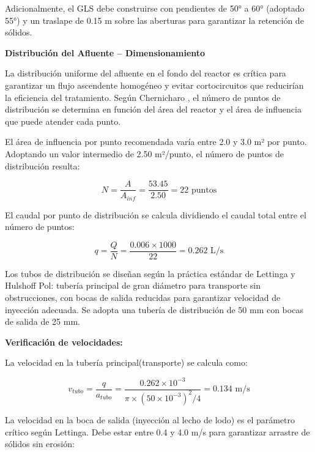 \documentclass[12pt,a4paper]{article}
\begin{document}
Adicionalmente, el GLS debe construirse con pendientes de 50° a 60° (adoptado 55°) y un traslape de 0.15 m sobre las aberturas para garantizar la retención de sólidos.

\textbf{Distribución del Afluente -- Dimensionamiento}

La distribución uniforme del afluente en el fondo del reactor es crítica para garantizar un flujo ascendente homogéneo y evitar cortocircuitos que reducirían la eficiencia del tratamiento. Según Chernicharo \cite{chernicharo2007}, el número de puntos de distribución se determina en función del área del reactor y el área de influencia que puede atender cada punto.

El área de influencia por punto recomendada varía entre 2.0 y 3.0 m² por punto. Adoptando un valor intermedio de 2.50 m²/punto, el número de puntos de distribución resulta:

\begin{equation}
N = \frac{A}{A_{inf}} = \frac{53.45}{2.50} = 22 \text{ puntos}
\end{equation}

El caudal por punto de distribución se calcula dividiendo el caudal total entre el número de puntos:

\begin{equation}
q = \frac{Q}{N} = \frac{0.006 \times 1000}{22} = 0.262 \text{ L/s}
\end{equation}

Los tubos de distribución se diseñan según la práctica estándar de Lettinga y Hulshoff Pol: tubería principal de gran diámetro para transporte sin obstrucciones, con bocas de salida reducidas para garantizar velocidad de inyección adecuada. Se adopta una tubería de distribución de 50 mm con bocas de salida de 25 mm.

\textbf{Verificación de velocidades:}

La velocidad en la tubería principal(transporte) se calcula como:

\begin{equation}
v_{tubo} = \frac{q}{a_{tubo}} = \frac{0.262 \times 10^{-3}}{\pi \times (50 \times 10^{-3})^2 / 4} = 0.134 \text{ m/s}
\end{equation}

La velocidad en la boca de salida (inyección al lecho de lodo) es el parámetro crítico según Lettinga. Debe estar entre 0.4 y 4.0 m/s para garantizar arrastre de sólidos sin erosión:
\end{document}
